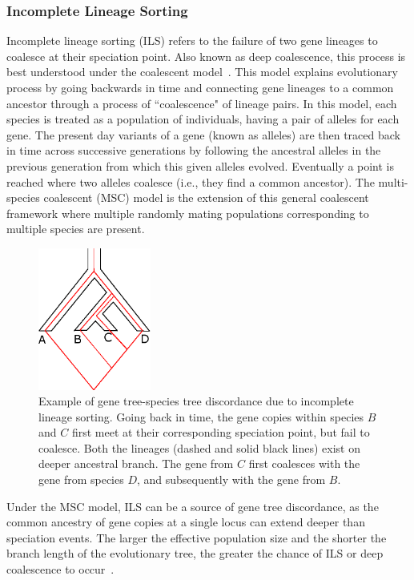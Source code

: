 \subsubsection{Incomplete Lineage Sorting}

Incomplete lineage sorting (ILS) refers to the failure of two gene lineages to coalesce at their speciation point. Also known as deep coalescence, this process is best understood under the coalescent model~\cite{degnan2006discordance, degnan2005gene}. This model explains evolutionary process by going backwards in time and connecting gene lineages to a common ancestor through a process of ``coalescence" of lineage pairs. In this model, each species is treated as a population of individuals, having a pair of alleles for each gene. The present day variants of a gene (known as alleles) are then traced back in time across successive generations by following the ancestral alleles in the previous generation from which this given alleles evolved. Eventually a point is reached where two alleles coalesce (i.e., they find a common ancestor). The multi-species coalescent (MSC) model is the extension of this general coalescent framework where multiple randomly mating populations corresponding to multiple species are present.
\begin{figure}[!tb]
	\centering
	\includegraphics[width=0.33\textwidth]{Figure/ils.eps}
	\caption{Example of gene tree-species tree discordance due to incomplete lineage sorting. Going back in time, the gene copies within species $B$ and $C$ first meet at their corresponding speciation point, but fail to coalesce. Both the lineages (dashed and solid black lines) exist on deeper ancestral branch. The gene from $C$ first coalesces with the gene from species $D$, and subsequently with the gene from $B$.
	}
	\label{fig:ils}
\end{figure}
Under the MSC model, ILS can be a source of gene tree discordance, as the common ancestry of gene copies at a single locus can extend deeper than speciation events. The larger the effective population size and the shorter the branch length of the evolutionary tree, the greater the chance of ILS or deep coalescence to occur~\cite{maddison1997gene}.

